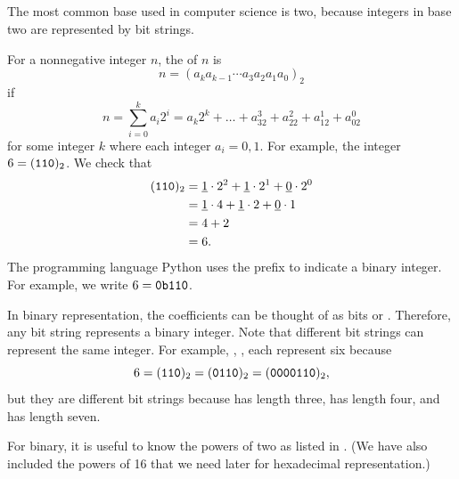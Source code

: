 \subsection{\subbinary}
\label{sub_binary}

The most common base used in computer science is two, because integers in base two are represented by bit strings.

\begin{defn}
\label{defn_binary}
     For a nonnegative integer $n$, the  of $n$ is 
            $$n=\left(a_ka_{k-1}\cdots a_3a_2a_1a_0\right)_2$$
        if 
            $$n=\sum_{i=0}^ka_i2^i = a_k2^k + \dots + a_32^ 3+a_22^2+a_12^1+a_02^0$$ 
        for some integer $k$ where each integer $a_i =0, 1$. For example, the integer $6=(\texttt{110})_2$.  We check that
            \begin{align*}
                (\texttt{110})_2 & = \underline{1} \cdot 2^2 +\underline{1} \cdot 2^1 +\underline{0} \cdot 2^0 \\
                & = \underline{1} \cdot 4 +\underline{1} \cdot 2 +\underline{0} \cdot 1 \\
                & = 4 + 2 \\
                & = 6.
            \end{align*} 
        The programming language Python uses the prefix  to indicate a binary integer. For example, we write $6=\texttt{0b110}$.
\end{defn}

\begin{rem}
\label{rem_bit_strings_binary}
    In binary representation, the coefficients can be thought of as bits  or . Therefore, any bit string represents a binary integer. Note that different bit strings can represent the same integer.  For example, , ,  each represent six because $$6=(\texttt{110})_2=(\texttt{0110})_2=(\texttt{0000110})_2,$$ but they are different bit strings because  has length three,  has length four, and  has length seven.
\end{rem}

For binary, it is useful to know the powers of two as listed in .  (We have also included the powers of 16 that we need later for hexadecimal representation.)

